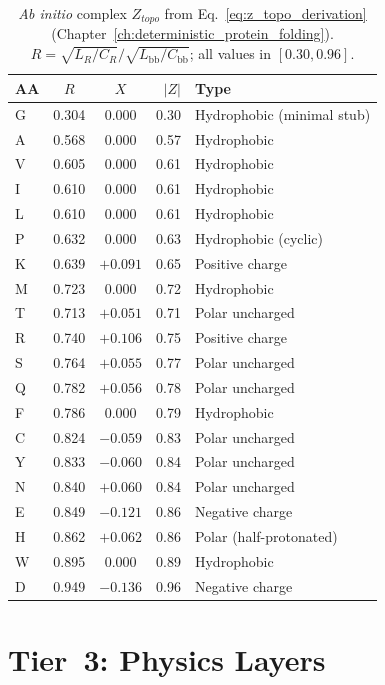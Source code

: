 \begin{table}[H]
\centering
\caption{\emph{Ab initio} complex $Z_{topo}$ from Eq.~\ref{eq:z_topo_derivation} (Chapter~\ref{ch:deterministic_protein_folding}).  $R = \sqrt{L_R/C_R}/\sqrt{L_\text{bb}/C_\text{bb}}$; all values in $[0.30, 0.96]$.}
\label{tab:z_topo_complex}
\small
\begin{tabular}{@{}l c c r l@{}}
\toprule
\textbf{AA} & $R$ & $X$ & $|Z|$ & \textbf{Type} \\
\midrule
G & 0.304 & 0.000 & 0.30 & Hydrophobic (minimal stub) \\
A & 0.568 & 0.000 & 0.57 & Hydrophobic \\
V & 0.605 & 0.000 & 0.61 & Hydrophobic \\
I & 0.610 & 0.000 & 0.61 & Hydrophobic \\
L & 0.610 & 0.000 & 0.61 & Hydrophobic \\
P & 0.632 & 0.000 & 0.63 & Hydrophobic (cyclic) \\
K & 0.639 & $+0.091$ & 0.65 & Positive charge \\
M & 0.723 & 0.000 & 0.72 & Hydrophobic \\
T & 0.713 & $+0.051$ & 0.71 & Polar uncharged \\
R & 0.740 & $+0.106$ & 0.75 & Positive charge \\
S & 0.764 & $+0.055$ & 0.77 & Polar uncharged \\
Q & 0.782 & $+0.056$ & 0.78 & Polar uncharged \\
F & 0.786 & 0.000 & 0.79 & Hydrophobic \\
C & 0.824 & $-0.059$ & 0.83 & Polar uncharged \\
Y & 0.833 & $-0.060$ & 0.84 & Polar uncharged \\
N & 0.840 & $+0.060$ & 0.84 & Polar uncharged \\
E & 0.849 & $-0.121$ & 0.86 & Negative charge \\
H & 0.862 & $+0.062$ & 0.86 & Polar (half-protonated) \\
W & 0.895 & 0.000 & 0.89 & Hydrophobic \\
D & 0.949 & $-0.136$ & 0.96 & Negative charge \\
\bottomrule
\end{tabular}
\end{table}


\section{Tier~3: Physics Layers}

